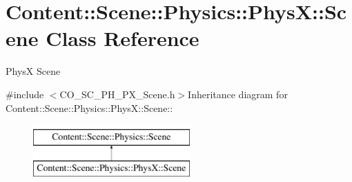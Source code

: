\hypertarget{classContent_1_1Scene_1_1Physics_1_1PhysX_1_1Scene}{
\section{Content::Scene::Physics::PhysX::Scene Class Reference}
\label{classContent_1_1Scene_1_1Physics_1_1PhysX_1_1Scene}
}


PhysX Scene  


{\ttfamily \#include $<$CO\_\-SC\_\-PH\_\-PX\_\-Scene.h$>$}Inheritance diagram for Content::Scene::Physics::PhysX::Scene::\begin{figure}[H]
\begin{center}
\leavevmode
\includegraphics[height=2cm]{classContent_1_1Scene_1_1Physics_1_1PhysX_1_1Scene}
\end{center}
\end{figure}
